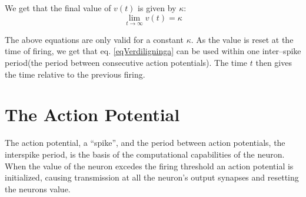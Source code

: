 
We get that the final value of $v(t)$ is given by $\kappa$: 
\begin{equation}
	\lim_{t\to\infty} v(t) = \kappa
	\label{eqKappaSomFinalValueAvV}
\end{equation}

The above equations are only valid for a constant $\kappa$. 
As the value is reset at the time of firing, we get that eq. \eqref{eqVerdiligninga} can be used within one inter--spike period(the period between consecutive action potentials).
The time $t$ then gives the time relative to the previous firing.





\section{The Action Potential}
The action potential, a ``spike'', and the period between action potentials, the interspike period, is the basis of the computational capabilities of the neuron.
When the value of the neuron excedes the firing threshold an action potential is initialized, causing transmission at all the neuron's output synapses and resetting the neurons value.

